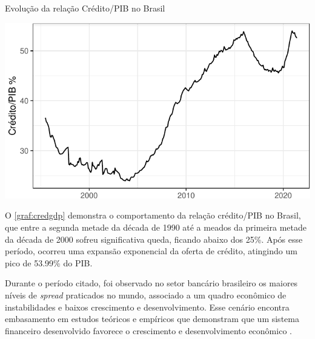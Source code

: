 \documentclass[
  12pt,
  12pt,
  openright,
  oneside,
  a4paper,
  chapter=TITLE,
  section=TITLE,
  subsection=TITLE,
  subsubsection=TITLE,
  portugues,
  sumario=tradicional]{abntex2}
\begin{document}
\begin{grafico}[!htb]
\vspace{20pt}
\caption{Evolução da relação Crédito/PIB no Brasil}
\vspace{-4mm}

\begin{center}\includegraphics{12-exportedfigures/credit.gdp-1} \end{center}
\vspace{-3mm}
\label{graf:credgdp}
\vspace{-2mm}
\end{grafico}

O \autoref{graf:credgdp} demonstra o comportamento da relação crédito/PIB no Brasil, que entre a segunda metade da década de 1990 até a meados da primeira metade da década de 2000 sofreu significativa queda, ficando abaixo dos 25\%. Após esse período, ocorreu uma expansão exponencial da oferta de crédito, atingindo um pico de 53.99\% do PIB.

Durante o período citado, foi observado no setor bancário brasileiro os maiores níveis de \emph{spread} praticados no mundo, associado a um quadro econômico de instabilidades e baixos crescimento e desenvolvimento. Esse cenário encontra embasamento em estudos teóricos e empíricos que demonstram que um sistema financeiro desenvolvido favorece o crescimento e desenvolvimento econômico \cite{levine:1997, matos:2003}.
\end{document}
